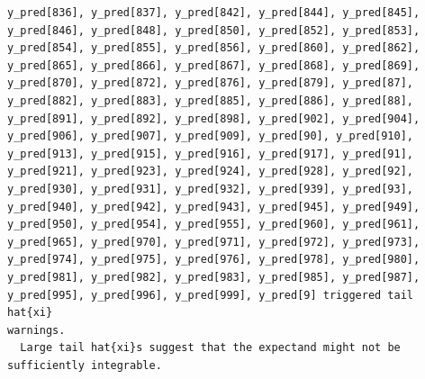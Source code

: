 \documentclass[
  letterpaper,
  DIV=11,
  numbers=noendperiod]{scrartcl}
\begin{document}
\begin{verbatim}
y_pred[836], y_pred[837], y_pred[842], y_pred[844], y_pred[845],
y_pred[846], y_pred[848], y_pred[850], y_pred[852], y_pred[853],
y_pred[854], y_pred[855], y_pred[856], y_pred[860], y_pred[862],
y_pred[865], y_pred[866], y_pred[867], y_pred[868], y_pred[869],
y_pred[870], y_pred[872], y_pred[876], y_pred[879], y_pred[87],
y_pred[882], y_pred[883], y_pred[885], y_pred[886], y_pred[88],
y_pred[891], y_pred[892], y_pred[898], y_pred[902], y_pred[904],
y_pred[906], y_pred[907], y_pred[909], y_pred[90], y_pred[910],
y_pred[913], y_pred[915], y_pred[916], y_pred[917], y_pred[91],
y_pred[921], y_pred[923], y_pred[924], y_pred[928], y_pred[92],
y_pred[930], y_pred[931], y_pred[932], y_pred[939], y_pred[93],
y_pred[940], y_pred[942], y_pred[943], y_pred[945], y_pred[949],
y_pred[950], y_pred[954], y_pred[955], y_pred[960], y_pred[961],
y_pred[965], y_pred[970], y_pred[971], y_pred[972], y_pred[973],
y_pred[974], y_pred[975], y_pred[976], y_pred[978], y_pred[980],
y_pred[981], y_pred[982], y_pred[983], y_pred[985], y_pred[987],
y_pred[995], y_pred[996], y_pred[999], y_pred[9] triggered tail hat{xi}
warnings.
  Large tail hat{xi}s suggest that the expectand might not be
sufficiently integrable.
 

\end{verbatim}
\end{document}
